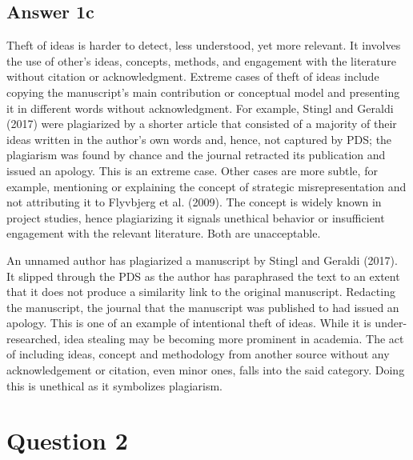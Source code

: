 \documentclass[
  11pt, %
]{assignment}
\begin{document}
\subsection*{Answer 1c}

\begin{problem}
Theft of ideas is harder to detect, less understood, yet more relevant. It involves the use of
other's ideas, concepts, methods, and engagement with the literature without citation or
acknowledgment. Extreme cases of theft of ideas include copying the manuscript's main
contribution or conceptual model and presenting it in different words without
acknowledgment. For example, Stingl and Geraldi (2017) were plagiarized by a shorter article
that consisted of a majority of their ideas written in the author's own words and, hence, not
captured by PDS\@; the plagiarism was found by chance and the journal retracted its publication
and issued an apology. This is an extreme case. Other cases are more subtle, for example,
mentioning or explaining the concept of strategic misrepresentation and not attributing it to
Flyvbjerg et al. (2009). The concept is widely known in project studies, hence plagiarizing it
signals unethical behavior or insufficient engagement with the relevant literature. Both are
unacceptable.
\end{problem}

An unnamed author has plagiarized a manuscript by Stingl and Geraldi (2017). It slipped through the PDS as the author has paraphrased the text to an extent that it does not produce a similarity link to the original manuscript. Redacting the manuscript, the journal that the manuscript was published to had issued an apology. This is one of an example of intentional theft of ideas. While it is under-researched, idea stealing may be becoming more prominent in academia. The act of including ideas, concept and methodology from another source without any acknowledgement or citation, even minor ones, falls into the said category. Doing this is unethical as it symbolizes plagiarism.

\section*{Question 2}
\end{document}
